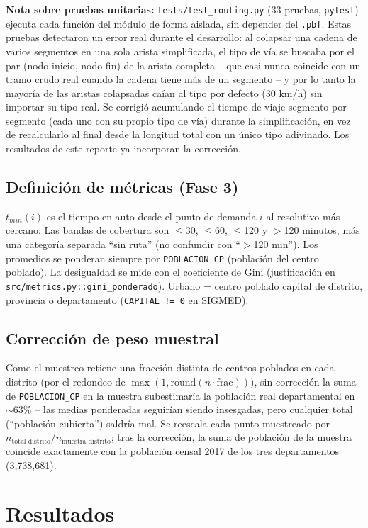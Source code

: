 \documentclass[11pt,a4paper]{article}
\begin{document}
\textbf{Nota sobre pruebas unitarias:} \texttt{tests/test\_routing.py}
(33 pruebas, \texttt{pytest}) ejecuta cada función del módulo de forma
aislada, sin depender del \texttt{.pbf}. Estas pruebas detectaron un error
real durante el desarrollo: al colapsar una cadena de varios segmentos en
una sola arista simplificada, el tipo de vía se buscaba por el par
(nodo-inicio, nodo-fin) de la arista completa -- que casi nunca coincide
con un tramo crudo real cuando la cadena tiene más de un segmento -- y por
lo tanto la mayoría de las aristas colapsadas caían al tipo por defecto
(30 km/h) sin importar su tipo real. Se corrigió acumulando el tiempo de
viaje segmento por segmento (cada uno con su propio tipo de vía) durante la
simplificación, en vez de recalcularlo al final desde la longitud total con
un único tipo adivinado. Los resultados de este reporte ya incorporan la
corrección.

\subsection{Definición de métricas (Fase 3)}
$t_{min}(i)$ es el tiempo en auto desde el punto de demanda $i$ al
resolutivo más cercano. Las bandas de cobertura son $\leq$30, $\leq$60,
$\leq$120 y $>$120 minutos, más una categoría separada ``sin ruta''
(no confundir con ``$>$120 min''). Los promedios se ponderan siempre por
\texttt{POBLACION\_CP} (población del centro poblado). La desigualdad se
mide con el coeficiente de Gini (justificación en
\texttt{src/metrics.py::gini\_ponderado}). Urbano = centro poblado capital
de distrito, provincia o departamento (\texttt{CAPITAL != 0} en SIGMED).

\subsection{Corrección de peso muestral}
Como el muestreo retiene una fracción distinta de centros poblados en cada
distrito (por el redondeo de $\max(1, \text{round}(n\cdot\text{frac}))$),
sin corrección la suma de \texttt{POBLACION\_CP} en la muestra subestimaría
la población real departamental en $\sim$63\% -- las medias ponderadas
seguirían siendo insesgadas, pero cualquier total (``población cubierta'')
saldría mal. Se reescala cada punto muestreado por
$n_{\text{total distrito}}/n_{\text{muestra distrito}}$; tras la
corrección, la suma de población de la muestra coincide exactamente con la
población censal 2017 de los tres departamentos (3{,}738{,}681).

\section{Resultados}
\end{document}
